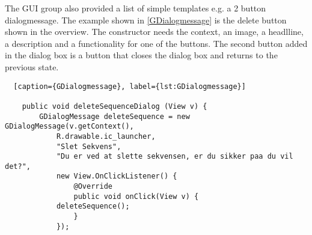The GUI group also provided a list of simple templates e.g. a 2 button dialogmessage. The example shown in \ref{GDialogmessage} is the delete button shown in the overview. The constructor needs the context, an image, a headlline, a description and a functionality for one of the buttons. The second button added in the dialog box is a button that closes the dialog box and returns to the previous state.

\begin{lstlisting}  [caption={GDialogmessage}, label={lst:GDialogmessage}]

    public void deleteSequenceDialog (View v) {
        GDialogMessage deleteSequence = new GDialogMessage(v.getContext(),
            R.drawable.ic_launcher,
            "Slet Sekvens",
            "Du er ved at slette sekvensen, er du sikker paa du vil det?",
            new View.OnClickListener() {
                @Override
                public void onClick(View v) {
			deleteSequence();
                }
            });

\end{lstlisting}